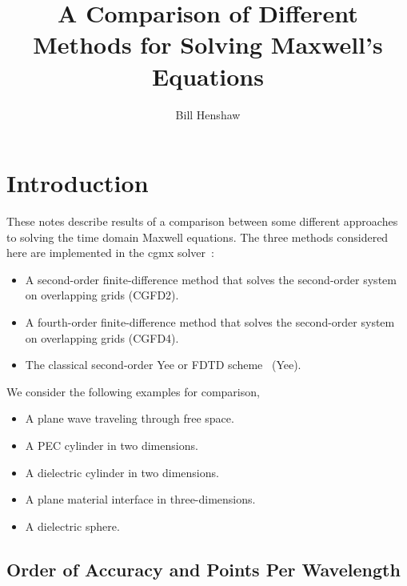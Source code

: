 \documentclass[11pt]{article}
\begin{document}
 
\title{A Comparison of Different Methods for Solving Maxwell's Equations}

\author{
Bill Henshaw \\
}
 
\maketitle

\tableofcontents

\section{Introduction}

These notes describe results of a comparison between some different approaches to 
solving the time domain Maxwell equations.
%
The three methods considered here are implemented in the cgmx solver~\cite{max2006b}:
\begin{itemize}
  \item A second-order finite-difference method that solves the second-order system on overlapping grids (CGFD2).
  \item A fourth-order finite-difference method that solves the second-order system on overlapping grids (CGFD4).
  \item The classical second-order Yee or FDTD scheme~\cite{Taflove2000,Yee66} (Yee).
\end{itemize}

We consider the following examples for comparison,
\begin{itemize}
  \item A plane wave traveling through free space.
  \item A PEC cylinder in two dimensions.
  \item A dielectric cylinder in two dimensions.
  \item A plane material interface in three-dimensions.
  \item A dielectric sphere. 
\end{itemize}

\clearpage
\newcommand{\tol}{\tau}
\subsection{Order of Accuracy and Points Per Wavelength}
\end{document}
